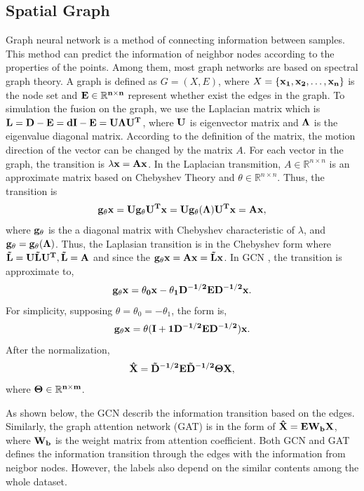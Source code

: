 \documentclass[english,onecolumn]{IEEEtran}
\begin{document}
	\subsection{Spatial Graph}
	Graph neural network is a method of connecting information between samples. This method can predict the information of neighbor nodes according to the properties of the points. Among them, most graph networks are based on spectral graph theory. A graph is defined as $G=(X,E)$, where $X=\{\bf x_1,x_2,\dots,x_n\}$ is the node set and $\bf E\in\mathbb{R}^{n\times n}$ represent whether exist the edges in the graph. To simulation the fusion on the graph, we use the Laplacian matrix which is $\bf L=D-E=dI-E=U\Lambda U^T$, where $\bf U$ is eigenvector matrix and $\bf \Lambda$ is the eigenvalue diagonal matrix. According to the definition of the matrix, the motion direction of the vector can be changed by the matrix $A$. For each vector in the graph, the transition is $\bf \lambda x =A x$.\cite{2} In the Laplacian transmition,  $A\in\mathbb{R}^{n\times n}$ is an approximate matrix based on Chebyshev Theory and $\theta\in\mathbb{R}^{n\times n}$. Thus, the transition is
	\[
	\bf g_{\theta}x=Ug_{\theta}U^Tx=Ug_{\theta}(\Lambda)U^Tx=Ax,
	\]
	where $\bf g_{\theta}$ is the a diagonal matrix with Chebyshev characteristic of $\lambda$, and $\bf g_{\theta}=g_{\theta}(\Lambda)$\cite{3}. Thus, the Laplasian transition is in the Chebyshev form where $\bf \tilde{L}=U\tilde{L}U^T, \tilde{L}=A$ and since the $\bf g_{\theta}x=Ax=\tilde{L}x$. In GCN \cite{gcn}, the transition is approximate to,
	\[
	\bf g_{\theta}x=\theta_0x-\theta_1D^{-1/2}ED^{-1/2}x.
	\]
	For simplicity, supposing $\theta=\theta_0=-\theta_1$, the form is,
	\[
	\bf g_{\theta}x=\theta(I+1D^{-1/2}ED^{-1/2})x.
	\]
	After the normalization,
	\[
	\bf \hat{X}=\tilde{D}^{-1/2}E\tilde{D}^{-1/2}\Theta X,
	\]
	where $\bf \Theta\in\mathbb{R}^{n\times m}$.
	
	As shown below, the GCN describ the information transition based on the edges. Similarly, the graph attention network (GAT) is in the form of $\bf \hat{X}=EW_bX$, where $\bf W_b$ is the weight matrix from attention coefficient\cite{gat}. Both GCN and GAT defines the information transition through the edges with the information from neigbor nodes. However, the labels also depend on the similar contents among the whole dataset.
	
	
\end{document}
